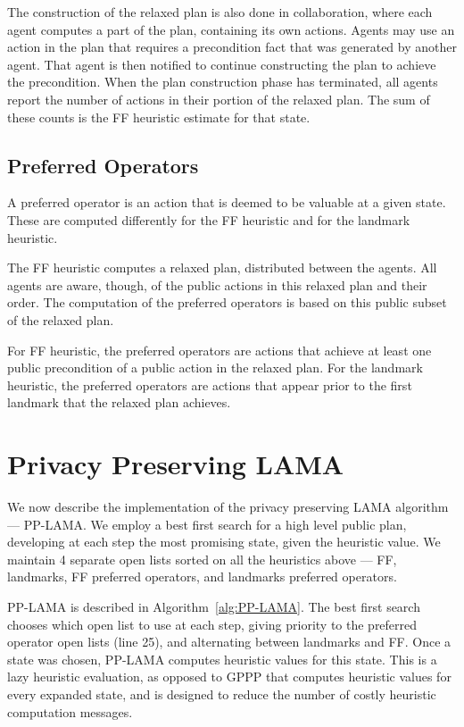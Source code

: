 \documentclass[letterpaper]{article}
\theoremstyle{definition}
\begin{document}
The construction of the relaxed plan is also done in collaboration, where each agent computes a part of the plan, containing its own actions. Agents may use an action in the plan that requires a precondition fact that was generated by another agent. That agent is then notified to continue constructing the plan to achieve the precondition. When the plan construction phase has terminated, all agents report the number of actions in their portion of the relaxed plan. The sum of these counts is the FF heuristic estimate for that state.

\subsection{Preferred Operators}

A preferred operator is an action that is deemed to be valuable at a given state. These are computed differently for the FF heuristic and for the landmark heuristic.

The FF heuristic computes a relaxed plan, distributed between the agents. All agents are aware, though, of the public actions in this relaxed plan and their order. The computation of the preferred operators is based on this public subset of the relaxed plan.

For FF heuristic, the preferred operators are actions that achieve at least one public precondition of a public action in the relaxed plan. For the landmark heuristic, the preferred operators are actions that appear prior to the first landmark that the relaxed plan achieves.


\section{Privacy Preserving LAMA}

We now describe the implementation of the privacy preserving LAMA algorithm --- PP-LAMA. We employ a best first search for a high level public plan, developing at each step the most promising state, given the heuristic value. We maintain 4 separate open lists sorted on all the heuristics above --- FF, landmarks, FF preferred operators, and landmarks preferred operators.


PP-LAMA is described in Algorithm~\ref{alg:PP-LAMA}. The best first search chooses which open list to use at each step, giving priority to the preferred operator open lists (line 25), and alternating between landmarks and FF. Once a state was chosen, PP-LAMA computes heuristic values for this state. This is a lazy heuristic evaluation, as opposed to GPPP that computes heuristic values for every expanded state, and is designed to reduce the number of costly heuristic computation messages.
\end{document}
